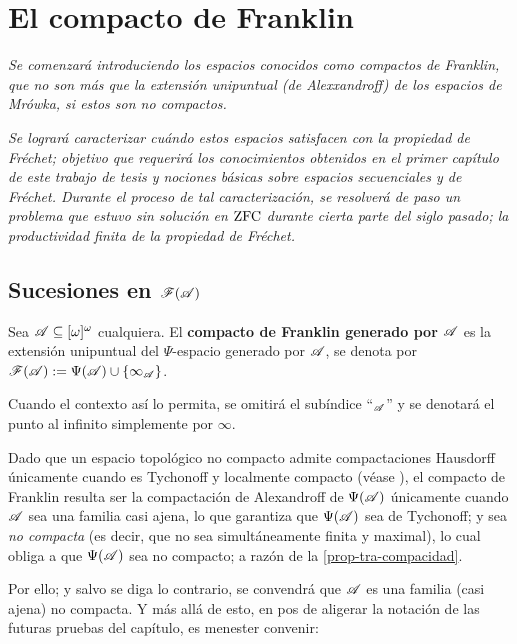 \chapter{El compacto de Franklin}
 \emph{\small Se comenzará introduciendo los espacios conocidos como \textit{compactos de Franklin}, que no son más que la extensión unipuntual (de Alexxandroff) de los espacios de Mrówka, si estos son no compactos.}

 \emph{\small Se logrará caracterizar cuándo estos espacios satisfacen con la propiedad de Fréchet; objetivo que requerirá los conocimientos obtenidos en el primer capítulo de este trabajo de tesis y nociones básicas sobre espacios secuenciales y de Fréchet. Durante el proceso de tal caracterización, se resolverá de paso un problema que estuvo sin solución en $\operatorname{ZFC}$ durante cierta parte del siglo pasado; la productividad finita de la propiedad de Fréchet.}

 \section{\texorpdfstring{Sucesiones en $\mathscr{F}(\mathscr{A})$}{Sucesiones en F(A)}}
 \label{Subsec-sucesiones-Franklin}

 \begin{definicion}
  Sea $\mathscr{A}\subseteq [\omega]^\omega$ cualquiera. El \textbf{compacto de Franklin generado por $\mathscr{A}$} es la extensión unipuntual del $\Psi$-espacio generado por $\mathscr{A}$, se denota por $ \mathscr{F}(\mathscr{A}):=\Psi(\mathscr{A}) \cup \{\infty_{\mathscr{A}} \} $.

  Cuando el contexto así lo permita, se omitirá el subíndice ``$_{\mathscr{A}}$'' y se denotará el punto al infinito simplemente por $\infty$.
 \end{definicion}

 Dado que un espacio topológico no compacto admite compactaciones Hausdorff únicamente cuando es Tychonoff y localmente compacto (véase \cite[p.~ 221]{fidelElementos}), el compacto de Franklin resulta ser la compactación de Alexandroff de $\Psi(\mathscr{A})$ únicamente cuando $\mathscr{A}$ sea una familia casi ajena, lo que garantiza que $\Psi(\mathscr{A})$ sea de Tychonoff; y sea \textit{no compacta} (es decir, que no sea simultáneamente finita y maximal), lo cual obliga a que $\Psi(\mathscr{A})$ sea no compacto; a razón de la \autoref{prop-tra-compacidad}.

 Por ello; y salvo se diga lo contrario, se convendrá que $\mathscr{A}$ es una familia (casi ajena) no compacta. Y más allá de esto, en pos de aligerar la notación de las futuras pruebas del capítulo, es menester convenir:

